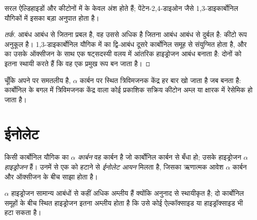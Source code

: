 \begin{proposition}[ईनॉल की मात्रा]\label{prop:b2:enolates-aldol:enol-content}
सरल ऐल्डिहाइडों और कीटोनों में  के केवल अंश होते हैं; पेंटेन-2,4-डाइओन जैसे
1,3-डाइकार्बोनिल यौगिकों में इसका बड़ा अनुपात होता है।
\end{proposition}

\begin{proof}[तर्क]
 आबंध  आबंध से जितना प्रबल है, वह उससे अधिक है जितना  आबंध 
आबंध से दुर्बल है: कीटो रूप अनुकूल है। 1,3-डाइकार्बोनिल यौगिक में  का द्वि-आबंध
दूसरे कार्बोनिल समूह से संयुग्मित होता है, और  का  उसके ऑक्सीजन के साथ एक षट्सदस्यी वलय में
आंतरिक हाइड्रोजन आबंध बनाता है: दोनों  को इतना स्थायी करते हैं कि वह एक प्रमुख रूप बन जाता है।
\end{proof}

चूँकि  अपने  पर समतलीय है, $\alpha$ कार्बन पर स्थित त्रिविमजनक केंद्र हर बार
खो जाता है जब  बनता है: कार्बोनिल के बगल में त्रिविमजनक केंद्र वाला कोई प्रकाशिक सक्रिय कीटोन अम्ल या
क्षारक में रेसेमिक हो जाता है।

\section{ईनोलेट}

\begin{definition}[ईनोलेट]\label{def:b2:enolates-aldol:enolate}
किसी कार्बोनिल यौगिक का \emph{$\alpha$ कार्बन} वह कार्बन है
जो कार्बोनिल कार्बन से बँधा हो; उसके हाइड्रोजन \emph{$\alpha$ हाइड्रोजन} हैं।
उनमें से एक को हटाने से \emph{ईनोलेट आयन} मिलता है, जिसका
ऋणात्मक आवेश $\alpha$ कार्बन और ऑक्सीजन के बीच साझा होता है।
\end{definition}

\begin{proposition}[$\alpha$ हाइड्रोजनों की अम्लता]\label{prop:b2:enolates-aldol:alpha-acidity}
$\alpha$ हाइड्रोजन सामान्य  आबंधों से कहीं अधिक अम्लीय हैं क्योंकि  अनुनाद से
स्थायीकृत है; दो कार्बोनिल समूहों के बीच स्थित हाइड्रोजन इतना अम्लीय होता है कि उसे कोई ऐल्कॉक्साइड या
हाइड्रॉक्साइड भी हटा सकता है।
\end{proposition}

